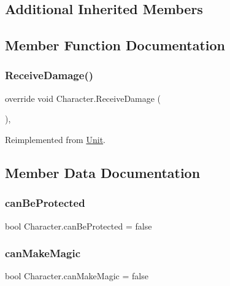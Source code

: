 \subsection*{Additional Inherited Members}


\subsection{Member Function Documentation}
\mbox{\label{class_character_a4c92566bccf29f534c3863eb12fddba2}} 
\subsubsection{\texorpdfstring{Receive\+Damage()}{ReceiveDamage()}}
{\footnotesize\ttfamily override void Character.\+Receive\+Damage (\begin{DoxyParamCaption}{ }\end{DoxyParamCaption})\hspace{0.3cm}{\ttfamily [inline]}, {\ttfamily [virtual]}}



Reimplemented from \mbox{\hyperlink{class_unit_a698a459fd5eeef7fc906f4657b723fa4}{Unit}}.



\subsection{Member Data Documentation}
\mbox{\label{class_character_a07fd3e211945cdfc6d813127908d48fb}} 
\subsubsection{\texorpdfstring{can\+Be\+Protected}{canBeProtected}}
{\footnotesize\ttfamily bool Character.\+can\+Be\+Protected = false}

\mbox{\label{class_character_ab0f4a965ac9a929654251db63b51131a}} 
\subsubsection{\texorpdfstring{can\+Make\+Magic}{canMakeMagic}}
{\footnotesize\ttfamily bool Character.\+can\+Make\+Magic = false}


